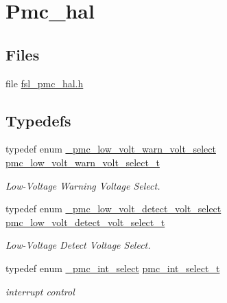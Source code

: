 \hypertarget{group__pmc__hal}{}\section{Pmc\+\_\+hal}
\label{group__pmc__hal}
\subsection*{Files}
\begin{DoxyCompactItemize}
\item 
file \hyperlink{fsl__pmc__hal_8h}{fsl\+\_\+pmc\+\_\+hal.\+h}
\end{DoxyCompactItemize}
\subsection*{Typedefs}
\begin{DoxyCompactItemize}
\item 
typedef enum \hyperlink{group__pmc__hal_ga9d145bde5873dd08a865c2b997612cc3}{\+\_\+pmc\+\_\+low\+\_\+volt\+\_\+warn\+\_\+volt\+\_\+select} \hyperlink{group__pmc__hal_ga23d4e14b50b88ae43a85363493fd71a5}{pmc\+\_\+low\+\_\+volt\+\_\+warn\+\_\+volt\+\_\+select\+\_\+t}\hypertarget{group__pmc__hal_ga23d4e14b50b88ae43a85363493fd71a5}{}\label{group__pmc__hal_ga23d4e14b50b88ae43a85363493fd71a5}

\begin{DoxyCompactList}\small\item\em Low-\/\+Voltage Warning Voltage Select. \end{DoxyCompactList}\item 
typedef enum \hyperlink{group__pmc__hal_ga48ebafb1e112fd0af6390e5d049ec133}{\+\_\+pmc\+\_\+low\+\_\+volt\+\_\+detect\+\_\+volt\+\_\+select} \hyperlink{group__pmc__hal_gacea884436a02284b201e65d65682db88}{pmc\+\_\+low\+\_\+volt\+\_\+detect\+\_\+volt\+\_\+select\+\_\+t}\hypertarget{group__pmc__hal_gacea884436a02284b201e65d65682db88}{}\label{group__pmc__hal_gacea884436a02284b201e65d65682db88}

\begin{DoxyCompactList}\small\item\em Low-\/\+Voltage Detect Voltage Select. \end{DoxyCompactList}\item 
typedef enum \hyperlink{group__pmc__hal_ga9b861bcdeda11a0e03077a7b913a3cb0}{\+\_\+pmc\+\_\+int\+\_\+select} \hyperlink{group__pmc__hal_ga1db67d1d76b8a50a72700ffc5eff3191}{pmc\+\_\+int\+\_\+select\+\_\+t}\hypertarget{group__pmc__hal_ga1db67d1d76b8a50a72700ffc5eff3191}{}\label{group__pmc__hal_ga1db67d1d76b8a50a72700ffc5eff3191}

\begin{DoxyCompactList}\small\item\em interrupt control \end{DoxyCompactList}\end{DoxyCompactItemize}
